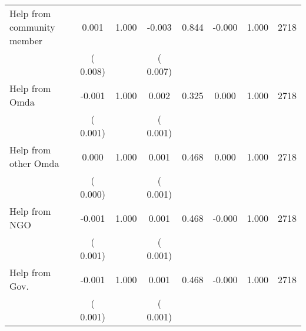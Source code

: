 \begin{tabular}{l*{7}{c}}
 Help from community member       &              0.001       &        1.000  &             -0.003       &        0.844  &             -0.000       &              1.000 &  2718 \\ 
                       &       (       0.008)             &                               &       (       0.007)                     &                               &                                               &                                &                      \\ 

 Help from Omda       &             -0.001       &        1.000  &              0.002       &        0.325  &              0.000       &              1.000 &  2718 \\ 
                       &       (       0.001)             &                               &       (       0.001)                     &                               &                                               &                                &                      \\ 

 Help from other Omda       &              0.000       &        1.000  &              0.001       &        0.468  &              0.000       &              1.000 &  2718 \\ 
                       &       (       0.000)             &                               &       (       0.001)                     &                               &                                               &                                &                      \\ 

 Help from NGO       &             -0.001       &        1.000  &              0.001       &        0.468  &             -0.000       &              1.000 &  2718 \\ 
                       &       (       0.001)             &                               &       (       0.001)                     &                               &                                               &                                &                      \\ 

 Help from Gov.       &             -0.001       &        1.000  &              0.001       &        0.468  &             -0.000       &              1.000 &  2718 \\ 
                       &       (       0.001)             &                               &       (       0.001)                     &                               &                                               &                                &                      \\ 

\hline \end{tabular}